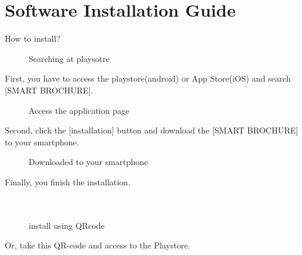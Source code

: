 \documentclass[conference]{IEEEtran}
\begin{document}
\section{Software Installation Guide\\}
 How to install?

\begin{figure}[htbp]
\begin{center}
    \caption{Searching at playsotre} 
\end{center}
\end{figure}

First, you have to access the playstore(android) or App Store(iOS) and search [SMART BROCHURE]. \\

\begin{figure}[htbp]
\begin{center}
    \caption{Access the application page} 
\end{center}
\end{figure}

Second, click the [installation] button and download the [SMART BROCHURE] to your smartphone.\\

\begin{figure}[htbp]
\begin{center}
    \caption{Downloaded to your smartphone} 
\end{center}
\end{figure}

Finally, you finish the installation. \\\\\\

\begin{figure}[htbp]
\begin{center}
    \caption{install using QRcode} 
\end{center}
\end{figure}

Or, take this QR-code and access to the Playstore.\\\\\\\\\\\\\\\\
\end{document}
